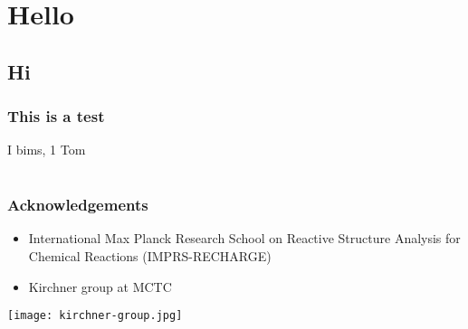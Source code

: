 \documentclass[t,
aspectratio=169,			%
]{beamer}
\begin{document}
%   
\section{Hello}
\subsection{Hi}

\begin{frame}
	\frametitle{This is a test}

	I bims, 1 Tom
\end{frame}

\appendix
\section{}              %

\begin{frame}
	\frametitle{Acknowledgements}

	\begin{itemize}
		\item International Max Planck Research School on Reactive Structure Analysis for Chemical Reactions (IMPRS-RECHARGE)
		\item Kirchner group at MCTC
	\end{itemize}


	\begin{center}
		\texttt{[image: kirchner-group.jpg]}
	\end{center}
\end{frame}
\end{document}
